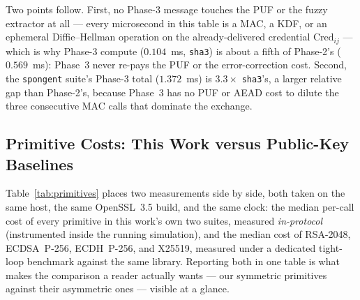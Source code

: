 \documentclass[11pt,a4paper]{article}
\begin{document}
Two points follow. First, no Phase-3 message touches the PUF or the fuzzy
extractor at all --- every microsecond in this table is a MAC, a KDF, or an
ephemeral Diffie--Hellman operation on the already-delivered credential
$\text{Cred}_{ij}$ --- which is why Phase-3 compute ($0.104$~ms, \texttt{sha3}) is
about a fifth of Phase-2's ($0.569$~ms): Phase~3 never re-pays the PUF or the
error-correction cost. Second, the \texttt{spongent} suite's Phase-3 total
($1.372$~ms) is $3.3\times$ \texttt{sha3}'s, a larger relative gap than Phase-2's,
because Phase~3 has no PUF or AEAD cost to dilute the three consecutive MAC calls
that dominate the exchange.

\subsection{Primitive Costs: This Work versus Public-Key Baselines}
\label{subsec:baselines}

Table~\ref{tab:primitives} places two measurements side by side, both taken on
the same host, the same OpenSSL~3.5 build, and the same clock: the median
per-call cost of every primitive in this work's own two suites, measured
\emph{in-protocol} (instrumented inside the running simulation), and the
median cost of RSA-2048, ECDSA~P-256, ECDH~P-256, and X25519, measured under a
dedicated tight-loop benchmark against the same library. Reporting both in one
table is what makes the comparison a reader actually wants --- our symmetric
primitives against their asymmetric ones --- visible at a glance.
\end{document}
